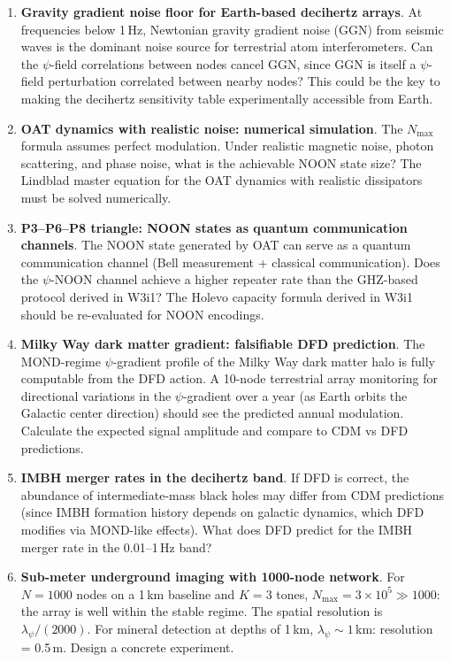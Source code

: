 \documentclass[11pt]{article}
\theoremstyle{definition}
\theoremstyle{remark}
\begin{document}
\begin{enumerate}

\item \textbf{Gravity gradient noise floor for Earth-based decihertz arrays}.
  At frequencies below 1\,Hz, Newtonian gravity gradient noise (GGN)
  from seismic waves is the dominant noise source for terrestrial
  atom interferometers. Can the $\psi$-field correlations between nodes
  cancel GGN, since GGN is itself a $\psi$-field perturbation correlated
  between nearby nodes? This could be the key to making the decihertz
  sensitivity table experimentally accessible from Earth.

\item \textbf{OAT dynamics with realistic noise: numerical simulation}.
  The $N_{\max}$ formula assumes perfect modulation. Under realistic
  magnetic noise, photon scattering, and phase noise, what is the
  achievable NOON state size? The Lindblad master equation for the
  OAT dynamics with realistic dissipators must be solved numerically.

\item \textbf{P3--P6--P8 triangle: NOON states as quantum communication channels}.
  The NOON state generated by OAT can serve as a quantum communication
  channel (Bell measurement + classical communication). Does the $\psi$-NOON
  channel achieve a higher repeater rate than the GHZ-based protocol
  derived in W3i1? The Holevo capacity formula derived in W3i1 should
  be re-evaluated for NOON encodings.

\item \textbf{Milky Way dark matter gradient: falsifiable DFD prediction}.
  The MOND-regime $\psi$-gradient profile of the Milky Way dark matter
  halo is fully computable from the DFD action. A 10-node terrestrial
  array monitoring for directional variations in the $\psi$-gradient
  over a year (as Earth orbits the Galactic center direction) should
  see the predicted annual modulation. Calculate the expected signal
  amplitude and compare to CDM vs DFD predictions.

\item \textbf{IMBH merger rates in the decihertz band}.
  If DFD is correct, the abundance of intermediate-mass black holes
  may differ from CDM predictions (since IMBH formation history depends
  on galactic dynamics, which DFD modifies via MOND-like effects).
  What does DFD predict for the IMBH merger rate in the 0.01--1\,Hz band?

\item \textbf{Sub-meter underground imaging with 1000-node network}.
  For $N = 1000$ nodes on a 1\,km baseline and $K=3$ tones,
  $N_{\max} = 3\times10^5 \gg 1000$: the array is well within the
  stable regime. The spatial resolution is $\lambda_\psi/(2000)$.
  For mineral detection at depths of 1\,km, $\lambda_\psi \sim 1$\,km:
  resolution = 0.5\,m. Design a concrete experiment.


\end{enumerate}
\end{document}
